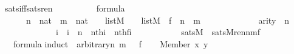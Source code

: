 \begin{isabellebody}
%
\isadelimproof
\isanewline
%
\endisadelimproof
\isanewline
{}\isamarkupfalse%
\ sats{\isacharunderscore}{\kern0pt}iff{\isacharunderscore}{\kern0pt}sats{\isacharunderscore}{\kern0pt}ren\ {\isacharcolon}{\kern0pt}\isanewline
\ \ \ {\isachardoublequoteopen}{\isasymphi}{\isachardoublequoteclose}\isanewline
\ \ \ {\isachardoublequoteopen}{\isasymphi}\ {\isasymin}\ formula{\isachardoublequoteclose}\isanewline
\ \ \ \ {\isachardoublequoteopen}{\isasymlbrakk}\ \ n\ {\isasymin}\ nat\ {\isacharsemicolon}{\kern0pt}\ m\ {\isasymin}\ nat\ {\isacharsemicolon}{\kern0pt}\ {\isasymrho}\ {\isasymin}\ list{\isacharparenleft}{\kern0pt}M{\isacharparenright}{\kern0pt}\ {\isacharsemicolon}{\kern0pt}\ {\isasymrho}{\isacharprime}{\kern0pt}\ {\isasymin}\ list{\isacharparenleft}{\kern0pt}M{\isacharparenright}{\kern0pt}\ {\isacharsemicolon}{\kern0pt}\ f\ {\isasymin}\ n\ {\isasymrightarrow}\ m\ {\isacharsemicolon}{\kern0pt}\isanewline
\ \ \ \ \ \ \ \ \ \ \ \ arity{\isacharparenleft}{\kern0pt}{\isasymphi}{\isacharparenright}{\kern0pt}\ {\isasymle}\ n\ {\isacharsemicolon}{\kern0pt}\isanewline
\ \ \ \ \ \ \ \ \ \ \ \ {\isasymAnd}\ i\ {\isachardot}{\kern0pt}\ i\ {\isacharless}{\kern0pt}\ n\ {\isasymLongrightarrow}\ nth{\isacharparenleft}{\kern0pt}i{\isacharcomma}{\kern0pt}{\isasymrho}{\isacharparenright}{\kern0pt}\ {\isacharequal}{\kern0pt}\ nth{\isacharparenleft}{\kern0pt}f{\isacharbackquote}{\kern0pt}i{\isacharcomma}{\kern0pt}{\isasymrho}{\isacharprime}{\kern0pt}{\isacharparenright}{\kern0pt}\ {\isasymrbrakk}\ {\isasymLongrightarrow}\isanewline
\ \ \ \ \ \ \ \ \ sats{\isacharparenleft}{\kern0pt}M{\isacharcomma}{\kern0pt}{\isasymphi}{\isacharcomma}{\kern0pt}{\isasymrho}{\isacharparenright}{\kern0pt}\ {\isasymlongleftrightarrow}\ sats{\isacharparenleft}{\kern0pt}M{\isacharcomma}{\kern0pt}ren{\isacharparenleft}{\kern0pt}{\isasymphi}{\isacharparenright}{\kern0pt}{\isacharbackquote}{\kern0pt}n{\isacharbackquote}{\kern0pt}m{\isacharbackquote}{\kern0pt}f{\isacharcomma}{\kern0pt}{\isasymrho}{\isacharprime}{\kern0pt}{\isacharparenright}{\kern0pt}{\isachardoublequoteclose}\isanewline
%
\isadelimproof
\ \ %
\endisadelimproof
%
\isatagproof
{}\isamarkupfalse%
\ {\isacartoucheopen}{\isasymphi}\ {\isasymin}\ formula{\isacartoucheclose}\isanewline
{}\isamarkupfalse%
{\isacharparenleft}{\kern0pt}induct\ {\isasymphi}\ arbitrary{\isacharcolon}{\kern0pt}n\ m\ {\isasymrho}\ {\isasymrho}{\isacharprime}{\kern0pt}\ f{\isacharparenright}{\kern0pt}\isanewline
\ \ \isamarkupfalse%
\ {\isacharparenleft}{\kern0pt}Member\ x\ y{\isacharparenright}{\kern0pt}\isanewline

\end{isabellebody}
